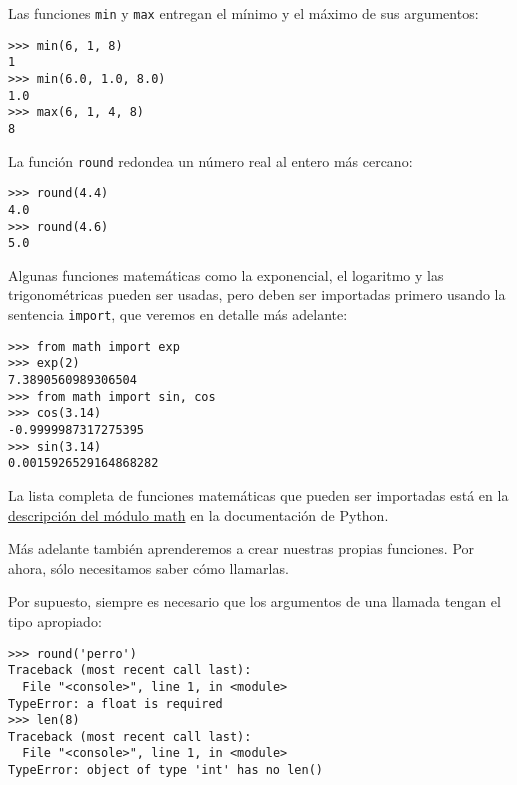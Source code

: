 Las funciones \lstinline!min! y \lstinline!max! entregan el mínimo y el
máximo de sus argumentos:

\begin{lstlisting}
>>> min(6, 1, 8)
1
>>> min(6.0, 1.0, 8.0)
1.0
>>> max(6, 1, 4, 8)
8
\end{lstlisting}

La función \lstinline!round! redondea un número real al entero más
cercano:

\begin{lstlisting}
>>> round(4.4)
4.0
>>> round(4.6)
5.0
\end{lstlisting}

Algunas funciones matemáticas como la exponencial, el logaritmo y las
trigonométricas pueden ser usadas, pero deben ser importadas primero
usando la sentencia \lstinline!import!, que veremos en detalle más
adelante:

\begin{lstlisting}
>>> from math import exp
>>> exp(2)
7.3890560989306504
>>> from math import sin, cos
>>> cos(3.14)
-0.9999987317275395
>>> sin(3.14)
0.0015926529164868282
\end{lstlisting}

La lista completa de funciones matemáticas que pueden ser importadas
está en la \href{http://docs.python.org/library/math.html}{descripción
del módulo math} en la documentación de Python.

Más adelante también aprenderemos a crear nuestras propias funciones.
Por ahora, sólo necesitamos saber cómo llamarlas.

Por supuesto, siempre es necesario que los argumentos de una llamada
tengan el tipo apropiado:

\begin{lstlisting}
>>> round('perro')
Traceback (most recent call last):
  File "<console>", line 1, in <module>
TypeError: a float is required
>>> len(8)
Traceback (most recent call last):
  File "<console>", line 1, in <module>
TypeError: object of type 'int' has no len()
\end{lstlisting}


